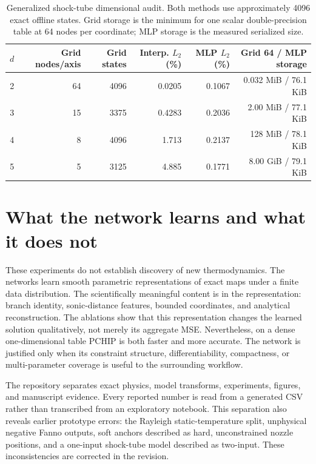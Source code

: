 \documentclass[11pt]{article}
\newenvironment{revision}{\color{revisionblue}}{}
\newenvironment{revision}{}{}
\begin{document}
\begin{revision}
\begin{table}[ht]
\centering
\caption{Generalized shock-tube dimensional audit. Both methods use approximately 4096 exact offline states. Grid storage is the minimum for one scalar double-precision table at 64 nodes per coordinate; MLP storage is the measured serialized size.}
\label{tab:dimension}
\small
\begin{tabular}{rrrrrr}
\toprule
$d$ & Grid nodes/axis & Grid states & Interp. $L_2$ (\%) & MLP $L_2$ (\%) & Grid 64 / MLP storage \\
\midrule
2 & 64 & 4096 & 0.0205 & 0.1067 & 0.032 MiB / 76.1 KiB \\
3 & 15 & 3375 & 0.4283 & 0.2036 & 2.00 MiB / 77.1 KiB \\
4 & 8 & 4096 & 1.713 & 0.2137 & 128 MiB / 78.1 KiB \\
5 & 5 & 3125 & 4.885 & 0.1771 & 8.00 GiB / 79.1 KiB \\
\bottomrule
\end{tabular}
\end{table}

\section{What the network learns and what it does not}
These experiments do not establish discovery of new thermodynamics. The networks learn smooth parametric representations of exact maps under a finite data distribution. The scientifically meaningful content is in the representation: branch identity, sonic-distance features, bounded coordinates, and analytical reconstruction. The ablations show that this representation changes the learned solution qualitatively, not merely its aggregate MSE. Nevertheless, on a dense one-dimensional table PCHIP is both faster and more accurate. The network is justified only when its constraint structure, differentiability, compactness, or multi-parameter coverage is useful to the surrounding workflow.

The repository separates exact physics, model transforms, experiments, figures, and manuscript evidence. Every reported number is read from a generated CSV rather than transcribed from an exploratory notebook. This separation also reveals earlier prototype errors: the Rayleigh static-temperature split, unphysical negative Fanno outputs, soft anchors described as hard, unconstrained nozzle positions, and a one-input shock-tube model described as two-input. These inconsistencies are corrected in the revision.


\end{revision}
\end{document}
